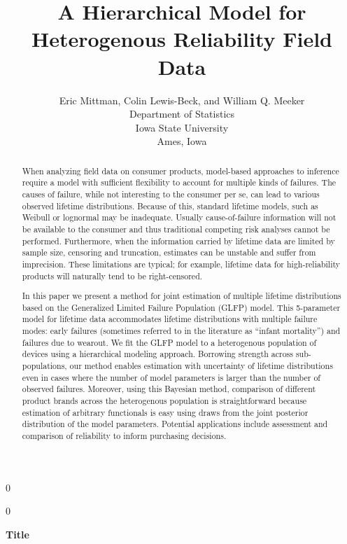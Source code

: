 \documentclass[12pt]{article}
\newcommand{\blind}{0}
\begin{document}
\def\spacingset#1{\renewcommand{\baselinestretch}%
{#1}\small\normalsize} \spacingset{1}



\blind
{
  \title{\bf A Hierarchical Model for Heterogenous Reliability Field Data}
  \author{Eric Mittman, Colin Lewis-Beck, and William Q. Meeker\\
  Department of Statistics\\
  Iowa State University\\
  Ames, Iowa}
  \maketitle
} \fi

\blind
{
  \bigskip
  \bigskip
  \bigskip
  \begin{center}
    {\LARGE\bf Title}
\end{center}
  \medskip
} \fi

\begin{abstract}
When analyzing field data on consumer products, model-based approaches to inference require a model with sufficient flexibility to account for multiple kinds of failures. The causes of failure, while not interesting to the consumer per se, can lead to various observed lifetime distributions. Because of this, standard lifetime models, such as Weibull or lognormal may be inadequate. Usually cause-of-failure information will not be available to the consumer and thus traditional competing risk analyses cannot be performed.
Furthermore, when the information carried by lifetime data are limited by sample size, censoring and truncation, estimates can be unstable and suffer from imprecision. These limitations are typical; for example, lifetime data for high-reliability products will naturally tend to be right-censored.


In this paper we present a method for joint estimation of multiple lifetime distributions based on the Generalized Limited Failure Population (GLFP) model. This 5-parameter model for lifetime data accommodates lifetime distributions with multiple failure modes:  early failures (sometimes referred to in the literature as ``infant mortality'') and failures due to wearout. We fit the GLFP model to a heterogenous population of devices using a hierarchical modeling approach.  Borrowing strength across sub-populations, our method enables estimation with uncertainty of lifetime distributions even in cases where the number of model parameters is larger than the number of observed failures.  Moreover, using this Bayesian method, comparison of different product brands across the heterogenous population is straightforward because estimation of arbitrary functionals is easy using draws from the joint posterior distribution of the model parameters. Potential applications include assessment and comparison of reliability to inform purchasing decisions.

\end{abstract}
\end{document}
